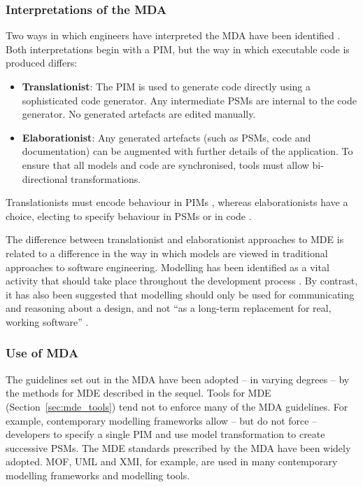 \subsubsection{Interpretations of the MDA}
Two \cc ways in which engineers have interpreted the MDA have been identified \cite{mcneile03mda}. Both interpretations begin with a PIM, but the way in which executable code is produced differs:

\begin{itemize}
 \item \textbf{Translationist}: The PIM is used to generate code directly using a sophisticated code generator. Any intermediate PSMs are internal to the code generator. No generated artefacts are edited manually.
 \item \textbf{Elaborationist}: Any generated artefacts (such as PSMs, code and documentation) can be augmented with further details of the application. To ensure that all models and code are synchronised, tools must allow bi-directional transformations.
\end{itemize}

Translationists must encode behaviour in PIMs \cite{mellor02executable}, whereas elaborationists have a choice, electing to specify behaviour in PSMs or in code \cite{kleppe03mda}.

The difference between translationist and elaborationist approaches to MDE is related to a difference in the way in which models are viewed in traditional approaches to software engineering. Modelling \cc has been identified as a vital activity that should take place throughout the development process \cite{evans04domain}. By contrast, it has also been suggested that modelling should only be used for communicating and reasoning about a design, and not ``as a long-term replacement for real, working software'' \cite[ch. 14]{martin06agile}.

\subsubsection{Use of MDA}
The guidelines set out in the MDA have been adopted -- in varying degrees -- by the methods for MDE described in the sequel. Tools for MDE (Section~\ref{sec:mde_tools}) tend not to enforce many of the MDA guidelines. For example, contemporary modelling frameworks allow -- but do not force -- developers to specify a single PIM and use model transformation to create successive PSMs. The MDE standards prescribed by the MDA have been widely adopted. MOF, UML and XMI, for example, are used in many contemporary modelling frameworks and modelling tools. 

